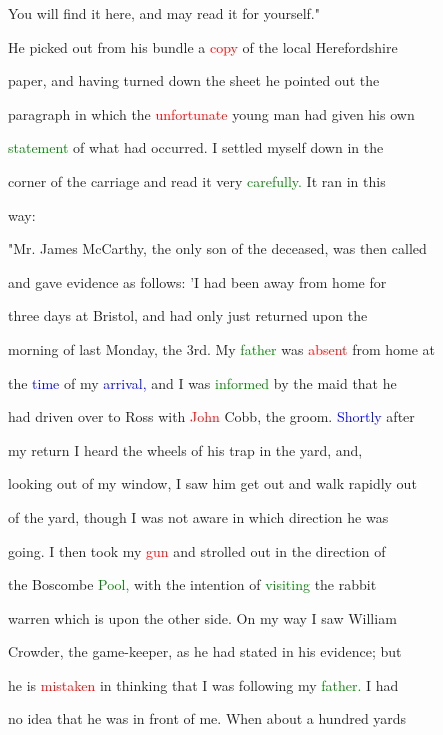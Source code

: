  You will find it here, and may read it for yourself."



 He picked out from his bundle a \textcolor{red}{copy} of the local Herefordshire

 paper, and having turned down the sheet he pointed out the

 paragraph in which the \textcolor{red}{unfortunate} \textcolor{BurntOrange}{young} man had given his own

 \textcolor{green}{statement} of what had occurred. I settled myself down in the

 corner of the carriage and read it very \textcolor{green}{carefully.} It ran in this

 way:



 "Mr. James McCarthy, the only son of the deceased, was then called

 and gave evidence as follows: 'I had been away from home for

 three days at Bristol, and had only just returned upon the

 morning of last Monday, the 3rd. My \textcolor{green}{father} was \textcolor{red}{absent} from home at

 the \textcolor{blue}{time} of my \textcolor{blue}{arrival,} and I was \textcolor{green}{informed} by the maid that he

 had driven over to Ross with \textcolor{red}{John} Cobb, the groom. \textcolor{blue}{Shortly} after

 my return I heard the wheels of his trap in the yard, and,

 looking out of my window, I saw him get out and walk rapidly out

 of the yard, though I was not aware in which direction he was

 going. I then took my \textcolor{red}{gun} and strolled out in the direction of

 the Boscombe \textcolor{green}{Pool,} with the intention of \textcolor{green}{visiting} the rabbit

 warren which is upon the other side. On my way I saw William

 Crowder, the game-keeper, as he had stated in his evidence; but

 he is \textcolor{red}{mistaken} in thinking that I was following my \textcolor{green}{father.} I had

 no idea that he was in front of me. When about a hundred yards

